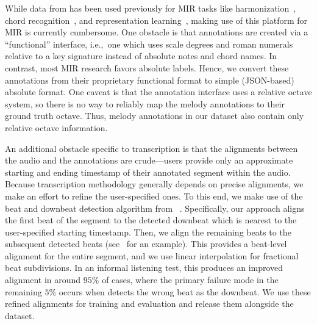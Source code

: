 While data from \hooktheory{} has been used previously for MIR tasks like 
harmonization~\cite{chen2021surprisenet,yeh2021automatic}, 
chord recognition~\cite{jiang2019mirex}, and 
representation learning~\cite{jiang2020transformer}, 
making use of this platform for MIR is currently cumbersome. 
One obstacle is that annotations are created via a ``functional'' interface, i.e.,~one which uses scale degrees and roman numerals relative to a key signature instead of absolute notes and chord names. 
In contrast, most MIR research favors absolute labels.
Hence, we convert these annotations from their proprietary functional format to simple (JSON-based) absolute format. 
One caveat is that the \hooktheory{} annotation interface uses a relative octave system, 
so there is no way to reliably map the melody annotations to their ground truth octave.
Thus, melody annotations in our dataset also contain only relative octave information.

An additional obstacle specific to transcription is that the alignments between the audio and the annotations are crude---users provide only an approximate starting and ending timestamp of their annotated segment within the audio. 
Because transcription methodology generally depends on precise alignments, we make an effort to refine the user-specified ones. 
To this end, we make use of the beat and downbeat detection algorithm from \madmom{}~\cite{bock2016joint,bock2016madmom}. 
Specifically, our approach aligns the first beat of the segment to the detected downbeat which is nearest to the user-specified starting timestamp. 
Then, we align the remaining beats to the subsequent detected beats (see~ for an example). 
This provides a beat-level alignment for the entire segment, and we use linear interpolation for fractional beat subdivisions. 
In an informal listening test, this produces an improved alignment in around $95\%$ of cases, where the primary failure mode in the remaining $5\%$ occurs when \madmom{} detects the wrong beat as the downbeat. 
We use these refined alignments for training and evaluation and release them alongside the dataset.

